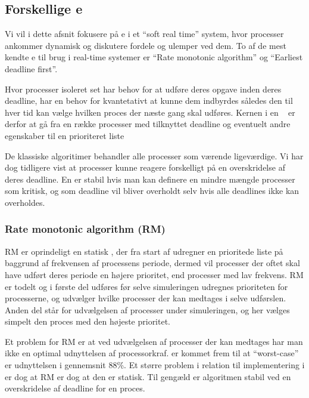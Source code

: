 \subsection{Forskellige \sched e}
Vi vil i dette afsnit fokusere på \sched e i et ``soft real time'' system,   hvor processer ankommer dynamisk og diskutere fordele og ulemper ved dem.
To af de mest kendte \sched e til brug i real-time systemer er ``Rate monotonic algorithm''\cite{lehoczky1989rate,liu1973scheduling} og ``Earliest deadline first''\cite{liu1973scheduling}.

Hvor processer isoleret set har behov for at udføre deres opgave inden deres deadline, har \sched en behov for kvantetativt at kunne  dem indbyrdes således den til hver tid kan vælge hvilken proces der næste gang skal udføres. Kernen i en  \sched ~ er derfor at gå fra en række processer med tilknyttet deadline og eventuelt andre egenskaber til en prioriteret liste 

De klassiske algoritimer behandler alle processer som værende ligeværdige. Vi har dog tidligere vist at processer kunne reagere forskelligt på en overskridelse af deres deadline. En \sched er stabil hvis man kan definere en mindre mængde processer som kritisk, og som deadline vil bliver overholdt selv hvis alle deadlines ikke kan overholdes.

\subsubsection{Rate monotonic algorithm (RM)}
RM er oprindeligt en statisk \sched, der fra start af udregner en prioritede liste på baggrund af frekvensen af processens periode, dermed vil processer der oftet skal have udført deres periode en højere prioritet, end processer med lav frekvens. RM er todelt og i første del udføres før selve simuleringen udregnes  prioriteten for processerne, og udvælger hvilke processer der kan medtages i selve udførslen. Anden del står for udvælgelsen af processer  under simuleringen, og her vælges simpelt den proces med den højeste prioritet. 

 Et problem for RM er at ved udvælgelsen af processer der kan medtages har man ikke en optimal udnyttelsen af processorkraf.  er kommet frem til at ``worst-case'' er udnyttelsen i gennemsnit 88\%\cite{lehoczky1989rate}. Et større problem i relation til implementering i \pycsp er dog at RM er dog at den er statisk. Til gengæld er algoritmen stabil ved en overskridelse af deadline for en proces. 

